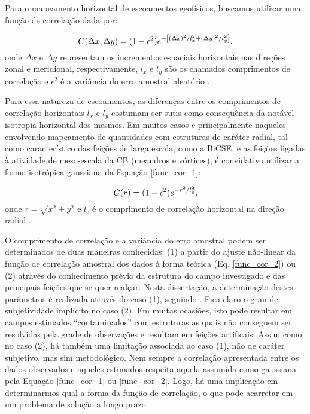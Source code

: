 Para o mapeamento horizontal de escoamentos geofísicos, buscamos utilizar uma função 
de correlação dada por:

\begin{equation}
C(\Delta x,\Delta y) = (1-\epsilon^{2})e^{-\left [ (\Delta x)^2/l_x^2 + (\Delta y)^2/l_y^2 \right ]},
\vspace{0.25cm}
\label{func_cor_1}
\end{equation}
onde $\Delta x$ e $\Delta y$ representam os incrementos espaciais horizontais nas 
direções zonal e meridional, respectivamente, $l_x$ e $l_y$ são os chamados comprimentos de 
correlação e $\epsilon^{2}$ é a variância do erro amostral aleatório \citep{carter_robinson1987}.

Para essa natureza de escoamentos, as diferenças entre os comprimentos de correla\-ção 
horizontais $l_x$ e $l_y$ costumam ser sutis como conseq\"uência da notável isotropia horizontal dos 
mesmos. Em muitos casos e principalmente naqueles envolvendo mapeamento de quantidades 
com estruturas de caráter radial, tal como característico das feições de larga escala, como a BiCSE,
e as feições ligadas à atividade de meso-escala da CB (meandros e vórtices),
é convidativo utilizar a forma isotrópica gaussiana da Equação \ref{func_cor_1}:

\begin{equation}
C(r) = (1-\epsilon^{2})e^{-{r^2/l_c^2}},
\vspace{0.25cm}
\label{func_cor_2}
\end{equation}
onde $r = \sqrt{x^2 + y^2}$ e $l_c$ é o comprimento de correlação horizontal na 
direção radial \citep{silveira_etal2000B}.

O comprimento de correlação e a variância do erro amostral podem ser determinados 
de duas maneiras conhecidas: (1) a partir do ajuste não-linear da função de correlação amostral 
dos dados à forma teórica (Eq. \ref{func_cor_2}) ou (2) através do conhecimento prévio da 
estrutura do campo investigado e das principais feições que se quer realçar. Nesta dissertação, 
a determinação destes parâmetros é realizada através do caso (1), seguindo \cite{silveira_etal2000B}. 
Fica claro o grau de subjetividade implícito no caso (2). Em muitas ocasiões, isto pode resultar 
em campos estimados ``contaminados'' com estruturas as quais não conseguem ser resolvidas pela 
grade de observações e resultam em feições artificais. Assim como no caso (2), há também uma 
limitação associada ao caso (1), não de caráter 
subjetivo, mas sim metodológico. Nem sempre a correlação apresentada entre os dados observados e 
aqueles estimados respeita aquela assumida como gaussiana pela Equação \ref{func_cor_1} ou 
\ref{func_cor_2}. Logo, há uma implicação em determinarmos qual a forma da função de correlação, 
o que pode acarretar em um problema de solução a longo prazo.

